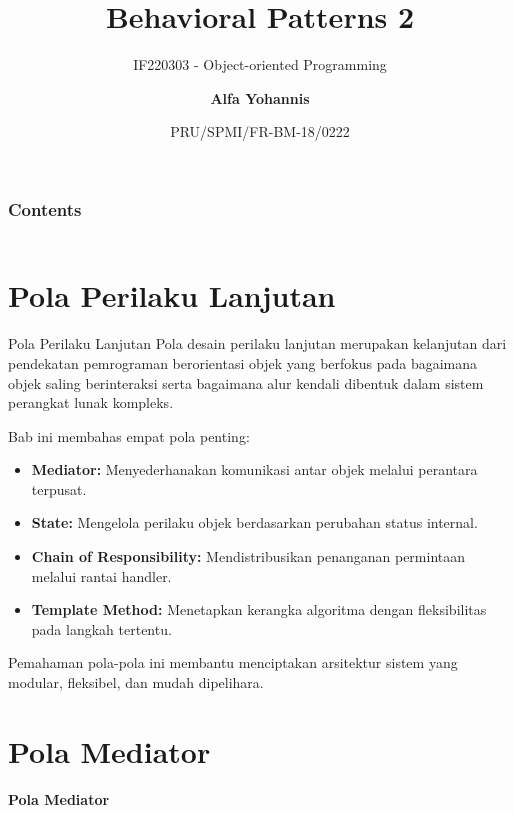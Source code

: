 \documentclass[aspectratio=169, table]{beamer}
\subtitle{IF220303 - Object-oriented Programming}
\title{\Huge{Behavioral Patterns 2}\\\vspace{30pt}}
\date[Serial]{\scriptsize {PRU/SPMI/FR-BM-18/0222}}
\author[Pradita]{\small {\textbf{Alfa Yohannis}}}
\begin{document}
\frame{\titlepage}

\begin{frame}[fragile]
\frametitle{Contents}
\vspace{20pt}
\begin{columns}[t]
\tableofcontents[sections={1-3}]

\tableofcontents[sections={4-5}]
\end{columns}
\end{frame}


\section{Pola Perilaku Lanjutan}

\begin{frame}{Pola Perilaku Lanjutan}
\vspace{10pt}
Pola desain perilaku lanjutan merupakan kelanjutan dari pendekatan pemrograman berorientasi objek yang berfokus pada bagaimana objek saling berinteraksi serta bagaimana alur kendali dibentuk dalam sistem perangkat lunak kompleks.

\vspace{10pt}
Bab ini membahas empat pola penting:
\begin{itemize}
\item \textbf{Mediator:} Menyederhanakan komunikasi antar objek melalui perantara terpusat.
\item \textbf{State:} Mengelola perilaku objek berdasarkan perubahan status internal.
\item \textbf{Chain of Responsibility:} Mendistribusikan penanganan permintaan melalui rantai handler.
\item \textbf{Template Method:} Menetapkan kerangka algoritma dengan fleksibilitas pada langkah tertentu.
\end{itemize}

\vspace{5pt}
Pemahaman pola-pola ini membantu menciptakan arsitektur sistem yang modular, fleksibel, dan mudah dipelihara.
\end{frame}

\section{Pola Mediator}
\begin{frame}{\hfill}
\centering
\textbf{\Huge{Pola Mediator}}
\end{frame}
\end{document}
